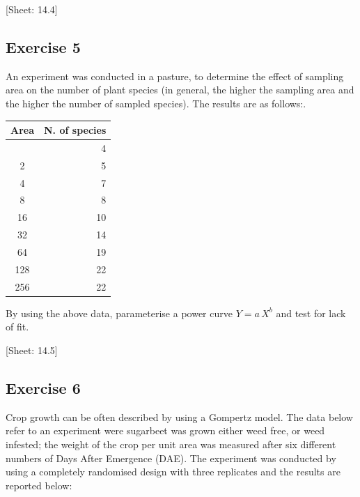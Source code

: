 \documentclass[a4paper,12pt,oneside]{book}
\begin{document}
{[}Sheet: 14.4{]}

\hypertarget{exercise-5-3}{%
\subsection{Exercise 5}\label{exercise-5-3}}

An experiment was conducted in a pasture, to determine the effect of sampling area on the number of plant species (in general, the higher the sampling area and the higher the number of sampled species). The results are as follows:.

\begin{longtable}[]{@{}cr@{}}
\toprule\noalign{}
Area & N. of species \\
\midrule\noalign{}
\endhead
\bottomrule\noalign{}
\endlastfoot
1 & 4 \\
2 & 5 \\
4 & 7 \\
8 & 8 \\
16 & 10 \\
32 & 14 \\
64 & 19 \\
128 & 22 \\
256 & 22 \\
\end{longtable}

By using the above data, parameterise a power curve \(Y = a \, X^b\) and test for lack of fit.

{[}Sheet: 14.5{]}

\hypertarget{exercise-6-3}{%
\subsection{Exercise 6}\label{exercise-6-3}}

Crop growth can be often described by using a Gompertz model. The data below refer to an experiment were sugarbeet was grown either weed free, or weed infested; the weight of the crop per unit area was measured after six different numbers of Days After Emergence (DAE). The experiment was conducted by using a completely randomised design with three replicates and the results are reported below:
\end{document}
